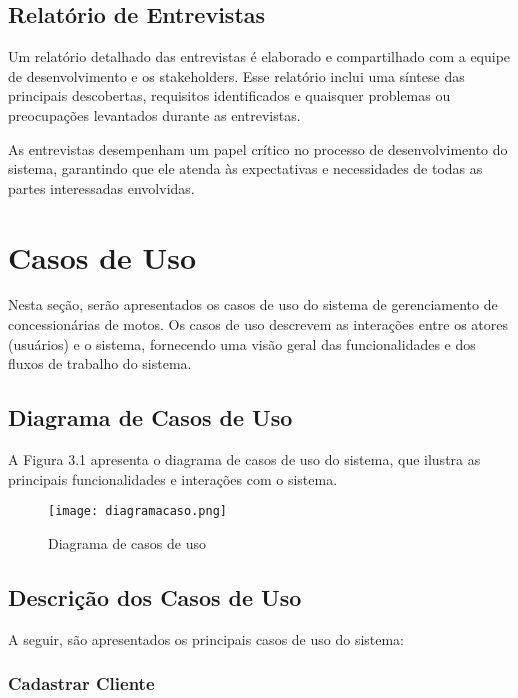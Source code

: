 \subsection{Relatório de Entrevistas}

Um relatório detalhado das entrevistas é elaborado e compartilhado com a equipe de desenvolvimento e os stakeholders. Esse relatório inclui uma síntese das principais descobertas, requisitos identificados e quaisquer problemas ou preocupações levantados durante as entrevistas.

As entrevistas desempenham um papel crítico no processo de desenvolvimento do sistema, garantindo que ele atenda às expectativas e necessidades de todas as partes interessadas envolvidas.



\section{Casos de Uso}

Nesta seção, serão apresentados os casos de uso do sistema de gerenciamento de concessionárias de motos. Os casos de uso descrevem as interações entre os atores (usuários) e o sistema, fornecendo uma visão geral das funcionalidades e dos fluxos de trabalho do sistema.

\subsection{Diagrama de Casos de Uso}

A Figura 3.1 apresenta o diagrama de casos de uso do sistema, que ilustra as principais funcionalidades e interações com o sistema.

\begin{figure}[h]
	\centering
	\texttt{[image: diagramacaso.png]}
	\caption{Diagrama de casos de uso}
	\label{fig:Diagrama de casos de uso}
\end{figure}

\subsection{Descrição dos Casos de Uso}

A seguir, são apresentados os principais casos de uso do sistema:

\subsubsection{Cadastrar Cliente}

